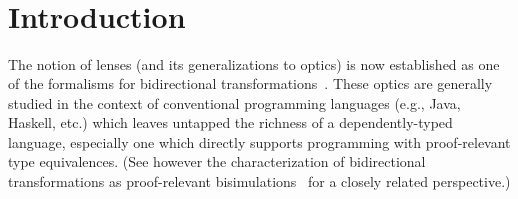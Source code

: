 \documentclass[sigplan,review,anonymous]{acmart}
\begin{document}
{\begin{code}
\AgdaOperator{\AgdaInductiveConstructor{,}}\AgdaSpace{}%
\AgdaSymbol{\}}\<%
\\
%
\>[4]\AgdaSymbol{;}\AgdaSpace{}%
\AgdaSpace{}%
\AgdaSymbol{=}\AgdaSpace{}%
\AgdaSpace{}%
\AgdaSymbol{\{}\AgdaSpace{}%
\AgdaSymbol{((}\AgdaSpace{}%
\AgdaOperator{\AgdaInductiveConstructor{,}}\AgdaSpace{}%
\AgdaSymbol{)}\AgdaSpace{}%
\AgdaOperator{\AgdaInductiveConstructor{,}}\AgdaSpace{}%
\AgdaSymbol{)}\AgdaSpace{}%
\AgdaSpace{}%
\AgdaSpace{}%
\AgdaOperator{\AgdaInductiveConstructor{,}}\AgdaSpace{}%
\AgdaSpace{}%
\AgdaOperator{\AgdaInductiveConstructor{,}}\AgdaSpace{}%
\AgdaSpace{}%
\AgdaSymbol{\}}\AgdaSpace{}%
\AgdaSymbol{\}}\<%
\\
%
\>[2]\AgdaSymbol{;}\AgdaSpace{}%
\AgdaSpace{}%
\AgdaSymbol{=}\AgdaSpace{}%
%
\>[686I]\AgdaSymbol{\{}\AgdaSpace{}%
\AgdaSpace{}%
\AgdaSymbol{=}\AgdaSpace{}%
\AgdaSpace{}%
\AgdaBound{\AgdaUnderscore{}}\AgdaSpace{}%
\AgdaSpace{}%
\AgdaSymbol{(}\AgdaSpace{}%
\AgdaSymbol{)}\AgdaSpace{}%
\AgdaOperator{\AgdaInductiveConstructor{,}}\AgdaSpace{}%
\AgdaSymbol{(}\AgdaSpace{}%
\AgdaSymbol{)}\AgdaSpace{}%
\AgdaOperator{\AgdaInductiveConstructor{,}}\AgdaSpace{}%
\AgdaSymbol{(}\AgdaSpace{}%
\AgdaSymbol{)}\<%
\\
\>[.]\<[686I]%
\>[24]\AgdaSymbol{;}\AgdaSpace{}%
\AgdaSpace{}%
\AgdaSymbol{=}\AgdaSpace{}%
\AgdaSpace{}%
\AgdaBound{\AgdaUnderscore{}}\AgdaSpace{}%
\AgdaSpace{}%
\AgdaSymbol{(}\AgdaSpace{}%
\AgdaSpace{}%
\AgdaOperator{\AgdaInductiveConstructor{,}}\AgdaSpace{}%
\AgdaSpace{}%
\AgdaSymbol{)}\AgdaSpace{}%
\AgdaOperator{\AgdaInductiveConstructor{,}}\AgdaSpace{}%
\AgdaSpace{}%
\AgdaSpace{}%
\AgdaSymbol{\}}\<%
\\
%
\>[2]\AgdaSymbol{\}}\<%
\end{code}
}
\section{Introduction}

The notion of lenses (and its generalizations to optics) is now
established as one of the formalisms for bidirectional
transformations~\cite{eaab8672ebea42538109e9f72ece5ed0}. These optics
are generally studied in the context of conventional programming
languages (e.g., Java, Haskell, etc.) which leaves untapped the
richness of a dependently-typed language, especially one which
directly supports programming with proof-relevant type
equivalences. (See however the characterization of bidirectional
transformations as proof-relevant
bisimulations~\cite{eaab8672ebea42538109e9f72ece5ed0} for a closely
related perspective.)
\end{document}

